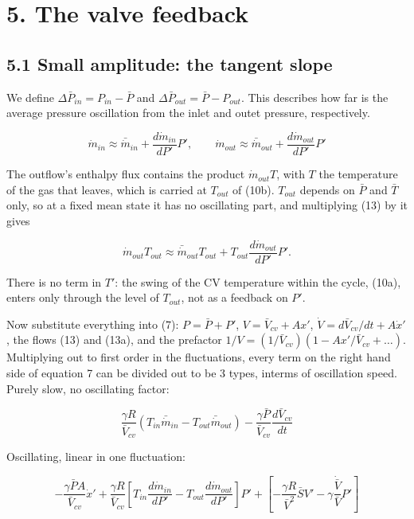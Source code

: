 \documentclass[11pt]{article}
\begin{document}
\section*{5. The valve feedback}

\subsection*{5.1 Small amplitude: the tangent slope}

We define $\Delta\bar P_{in} = P_{in} - \bar P$ and $\Delta\bar P_{out} = \bar P - P_{out}$. This describes how far is the average pressure oscillation from the inlet and outet pressure, respectively.

\begin{equation}
\dot{m}_{in} \approx \bar {\dot{m}}_{in} + \frac{d\dot{m}_{in}}{dP'}P', \qquad \dot{m}_{out} \approx \bar {\dot{m}}_{out} + \frac{d\dot{m}_{out}}{dP'}P' \tag{13}
\end{equation}

The outflow's enthalpy flux contains the product $\dot m_{out}T$, with $T$ the temperature of the gas that leaves, which is carried at $T_{out}$ of (10b). $T_{out}$ depends on $\bar P$ and $\bar T$ only, so at a fixed mean state it has no oscillating part, and multiplying (13) by it gives

\begin{equation}
\dot m_{out}T_{out} \approx \bar{\dot m}_{out}T_{out} + T_{out}\frac{d\dot m_{out}}{dP'}P' . \tag{13a}
\end{equation}

There is no term in $T'$: the swing of the CV temperature within the cycle, (10a), enters only through the level of $T_{out}$, not as a feedback on $P'$.

Now substitute everything into (7): $P = \bar P + P'$, $V = \bar V_{cv} + Ax'$, $\dot V = d\bar V_{cv}/dt + A\dot x'$, the flows (13) and (13a), and the prefactor $1/V = (1/\bar V_{cv})(1 - Ax'/\bar V_{cv} + \dots)$. Multiplying out to first order in the fluctuations, every term on the right hand side of equation 7 can be divided out to be 3 types, interms of oscillation speed. Purely slow, no oscillating factor:

\[
\frac{\gamma R}{\bar V_{cv}}\left(T_{in}\bar {\dot{m}}_{in} - T_{out}\bar {\dot{m}}_{out}\right) - \frac{\gamma\bar P}{\bar V_{cv}}\frac{d\bar V_{cv}}{dt}
\]

Oscillating, linear in one fluctuation:

\[
-\frac{\gamma\bar PA}{\bar V_{cv}}\dot x' + \frac{\gamma R}{\bar V_{cv}}\left[T_{in}\frac{d\dot{m}_{in}}{dP'} - T_{out}\frac{d\dot{m}_{out}}{dP'}\right]P' + \left[-\frac{\gamma R}{\bar{V}^2} \bar{S} V' - \gamma \frac{\dot{\bar{V}}}{\bar{V}} P'\right]
\]
\end{document}
